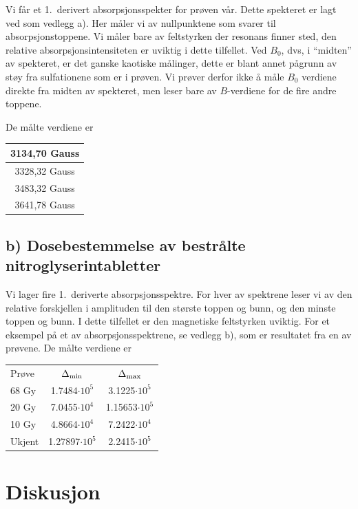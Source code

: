 \documentclass[a4paper, 11pt, notitlepage]{article}
\begin{document}
Vi får et 1.\ derivert absorpsjonsspekter for prøven vår. Dette spekteret er lagt ved som vedlegg a). Her måler vi av nullpunktene som svarer til absorpsjonstoppene. Vi måler bare av feltstyrken der resonans finner sted, den relative absorpsjonsintensiteten er uviktig i dette tilfellet. Ved $B_0$, dvs, i ``midten'' av spekteret, er det ganske kaotiske målinger, dette er blant annet pågrunn av støy fra sulfationene som er i prøven. Vi prøver derfor ikke å måle $B_0$ verdiene direkte fra midten av spekteret, men leser bare av $B$-verdiene for de fire andre toppene.

De målte verdiene er
\begin{center}
\begin{tabular}{c}
3134,70 Gauss \\
\hline
3328,32 Gauss \\
\hline
3483,32 Gauss \\
\hline
3641,78 Gauss
\end{tabular}
\end{center}

\subsection{b) Dosebestemmelse av bestrålte nitroglyserintabletter}
Vi lager fire 1.\ deriverte absorpsjonsspektre. For hver av spektrene leser vi av den relative forskjellen i amplituden til den største toppen og bunn, og den minste toppen og bunn. I dette tilfellet er den magnetiske feltstyrken uviktig. For et eksempel på et av absorpsjonsspektrene, se vedlegg b), som er resultatet fra en av prøvene. De målte verdiene er
\begin{center}
\begin{tabular}{l|c|c}
Prøve & $\Delta_{\rm min}$ & $\Delta_{\rm max}$ \\
68 Gy & 1.7484$\cdot10^5$ & 3.1225$\cdot10^5$ \\
20 Gy &	7.0455$\cdot10^4$ & 1.15653$\cdot10^5$ \\
10 Gy &	4.8664$\cdot10^4$ & 7.2422$\cdot10^4$ \\
Ukjent & 1.27897$\cdot10^5$ & 2.2415$\cdot10^5$
\end{tabular}
\end{center}

\clearpage 

\section{Diskusjon}
\end{document}
